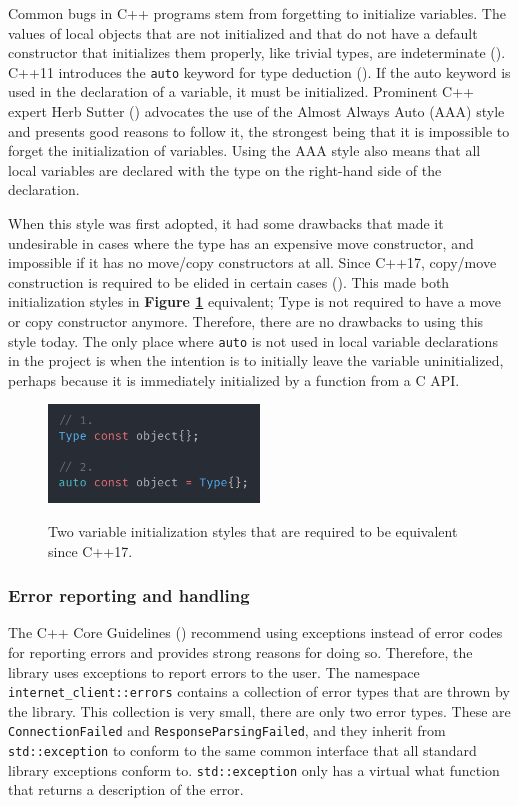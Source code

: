 \documentclass[12pt, a4paper]{article}
\begin{document}
Common bugs in C++ programs stem from forgetting to initialize variables. The values of local objects that are not initialized and that do not have a default constructor that initializes them properly, like trivial types, are indeterminate (\cite{CppDefaultInitialization}). C++11 introduces the \texttt{auto} keyword for type deduction (\cite{CppAuto}). If the auto keyword is used in the declaration of a variable, it must be initialized. Prominent C++ expert Herb Sutter (\citeyear{AlmostAlwaysAuto}) advocates the use of the Almost Always Auto (AAA) style and presents good reasons to follow it, the strongest being that it is impossible to forget the initialization of variables. Using the AAA style also means that all local variables are declared with the type on the right-hand side of the declaration. 

When this style was first adopted, it had some drawbacks that made it undesirable in cases where the type has an expensive move constructor, and impossible if it has no move/copy constructors at all. Since C++17, copy/move construction is required to be elided in certain cases (\cite{CppCopyElision}). This made both initialization styles in \textbf{Figure \ref{fig:auto_type_deduction}} equivalent; Type is not required to have a move or copy constructor anymore. Therefore, there are no drawbacks to using this style today. The only place where \texttt{auto} is not used in local variable declarations in the project is when the intention is to initially leave the variable uninitialized, perhaps because it is immediately initialized by a function from a C API.

\begin{figure}[ht]
	\centering
	\caption{Two variable initialization styles that are required to be equivalent since C++17.}
	\includegraphics[width=0.5\textwidth]{auto_type_deduction}
	\label{fig:auto_type_deduction}
\end{figure}

\subsubsection{Error reporting and handling}
The C++ Core Guidelines (\cite{CppCoreGuidelines}) recommend using exceptions instead of error codes for reporting errors and provides strong reasons for doing so. Therefore, the library uses exceptions to report errors to the user. The namespace \texttt{internet\_client::errors} contains a collection of error types that are thrown by the library. This collection is very small, there are only two error types. These are \texttt{ConnectionFailed} and \texttt{ResponseParsingFailed}, and they inherit from \texttt{std::exception} to conform to the same common interface that all standard library exceptions conform to. \texttt{std::exception} only has a virtual what function that returns a description of the error. 
\end{document}
